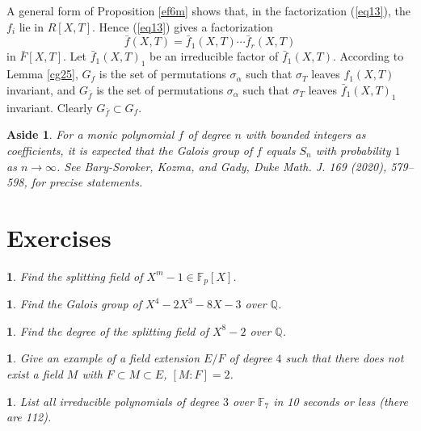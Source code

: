 \documentclass[a4paper,11pt,final,openany]{memoir}
\newtheorem{aside}[X]{Aside}
\newtheorem{exercise}[Y]{}
\theoremstyle{nonumberplain}
\begin{document}
A general form of Proposition \ref{ef6m} shows that, in the factorization
(\ref{eq13}), the $f_{i}$ lie in $R[X,T]$. Hence (\ref{eq13}) gives a
factorization%
\[
\bar{f}(X,T)=\bar{f}_{1}(X,T)\cdots\bar{f}_{r}(X,T)
\]
in $\bar{F}[X,T]$. Let $\bar{f}_{1}(X,T)_{1}$ be an irreducible factor of
$\bar{f}_{1}(X,T)$. According to Lemma \ref{cg25}, $G_{f}$ is the set of
permutations $\sigma_{\alpha}$ such that $\sigma_{T}$ leaves $f_{1}(X,T)$
invariant, and $G_{\bar{f}}$ is the set of permutations $\sigma_{\alpha}$ such
that $\sigma_{T}$ leaves $\bar{f}_{1}(X,T)_{1}$ invariant. Clearly $G_{\bar
{f}}\subset G_{f}$.

\begin{aside} For a monic polynomial $f$ of degree $n$ with bounded integers
as coefficients, it is expected that the Galois group of $f$ equals $S_n$
with probability $1$ as $n\rightarrow\infty$. See
Bary-Soroker, Kozma, and Gady, Duke Math. J. 169 (2020), 579--598,
for precise statements.
\end{aside}

\section{Exercises}

\begin{exercise}
\label{x14} Find the splitting field of $X^{m}-1\in\mathbb{F}_{p}[X]$.
\end{exercise}

\begin{exercise}
\label{x15} Find the Galois group of $X^{4}-2X^{3}-8X-3$ over ${\mathbb{Q}}$.
\end{exercise}

\begin{exercise}
\label{x16} Find the degree of the splitting field of $X^{8}- 2$ over
${\mathbb{Q}}$.
\end{exercise}

\begin{exercise}
\label{x17} Give an example of a field extension $E/F$ of degree $4$ such that
there does not exist a field $M$ with $F\subset M\subset E$, $[M\colon F]=2$.
\end{exercise}

\begin{exercise}
\label{x18} List all irreducible polynomials of degree $3 $ over
$\mathbb{F}_{7}$ in 10 seconds or less (there are 112).
\end{exercise}
\end{document}
